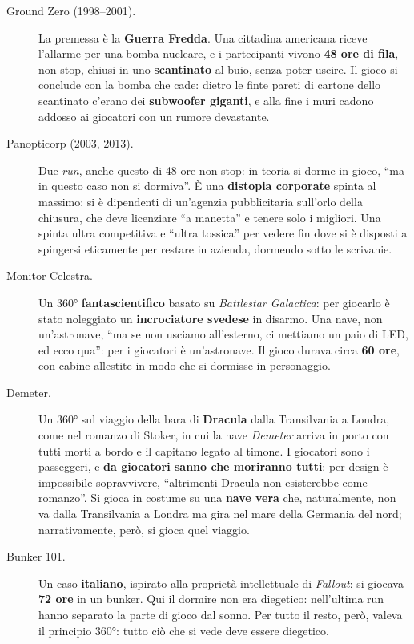 \begin{description}
  \item[Ground Zero (1998--2001).] La premessa è la \textbf{Guerra Fredda}.
        Una cittadina americana riceve l'allarme per una bomba nucleare, e i
        partecipanti vivono \textbf{48 ore di fila}, non stop, chiusi in uno
        \textbf{scantinato} al buio, senza poter uscire. Il gioco si conclude
        con la bomba che cade: dietro le finte pareti di cartone dello
        scantinato c'erano dei \textbf{subwoofer giganti}, e alla fine i muri
        cadono addosso ai giocatori con un rumore devastante.
  \item[Panopticorp (2003, 2013).] Due \emph{run}, anche questo di 48 ore non
        stop: in teoria si dorme in gioco, ``ma in questo caso non si dormiva''.
        È una \textbf{distopia corporate} spinta al massimo: si è dipendenti di
        un'agenzia pubblicitaria sull'orlo della chiusura, che deve licenziare
        ``a manetta'' e tenere solo i migliori. Una spinta ultra competitiva e
        ``ultra tossica'' per vedere fin dove si è disposti a spingersi eticamente
        per restare in azienda, dormendo sotto le scrivanie.
  \item[Monitor Celestra.] Un 360° \textbf{fantascientifico} basato su
        \emph{Battlestar Galactica}: per giocarlo è stato noleggiato un
        \textbf{incrociatore svedese} in disarmo. Una nave, non un'astronave,
        ``ma se non usciamo all'esterno, ci mettiamo un paio di LED, ed ecco
        qua'': per i giocatori è un'astronave. Il gioco durava circa
        \textbf{60 ore}, con cabine allestite in modo che si dormisse in
        personaggio.
  \item[Demeter.] Un 360° sul viaggio della bara di \textbf{Dracula} dalla
        Transilvania a Londra, come nel romanzo di Stoker, in cui la nave
        \emph{Demeter} arriva in porto con tutti morti a bordo e il capitano
        legato al timone. I giocatori sono i passeggeri, e \textbf{da giocatori
        sanno che moriranno tutti}: per design è impossibile sopravvivere,
        ``altrimenti Dracula non esisterebbe come romanzo''. Si gioca in
        costume su una \textbf{nave vera} che, naturalmente, non va dalla
        Transilvania a Londra ma gira nel mare della Germania del nord;
        narrativamente, però, si gioca quel viaggio.
  \item[Bunker 101.] Un caso \textbf{italiano}, ispirato alla proprietà
        intellettuale di \emph{Fallout}: si giocava \textbf{72 ore} in un bunker.
        Qui il dormire non era diegetico: nell'ultima run hanno separato la parte
        di gioco dal sonno. Per tutto il resto, però, valeva il principio 360°:
        tutto ciò che si vede deve essere diegetico.
\end{description}

